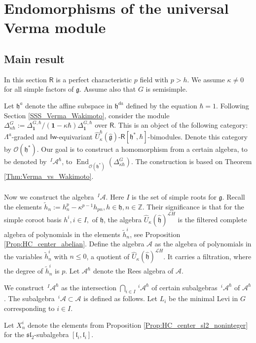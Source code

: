 \documentclass{amsart}
\theoremstyle{definition}
\newcommand{\slf}{\mathfrak{sl}}
\newcommand{\sss}{\subsubsection{}}
\newcommand{\Ring}{\mathsf{R}}
\newcommand{\g}{\mathfrak{g}}
\newcommand{\hg}{\hat{\mathfrak{g}}}
\newcommand{\h}{\mathfrak{h}}
\newcommand{\hh}{\hat{\mathfrak{h}}}
\newcommand{\Z}{\mathbb{Z}}
\newcommand{\lf}{\mathfrak{l}}
\newcommand{\A}{\mathscr{A}}
\newcommand{\Loop}{\mathscr{L}}
\newcommand{\bone}{\mathbf{1}}
\newcommand{\Iw}{\mathsf{Iw}}
\newcommand{\End}{\operatorname{End}}
\newcommand{\sO}{\mathscr{O}}
\numberwithin{equation}{section}
\begin{document}
\section{Endomorphisms of the universal Verma module}\label{S_Verma_endom}
\subsection{Main result}\label{SS:endo_main}
In this section $\Ring$ is a perfect characteristic $p$ field with $p>h$.
We assume $\kappa\neq 0$ for all simple factors of $\g$. Assume also that $G$ is semisimple.

Let $\h^a$ denote the affine subspace in $\h^{da}$ defined by the equation $\hbar=1$. Following Section \ref{SSS_Verma_Wakimoto}, consider the 
module $\Delta^{G}_{\kappa\hbar}:=\Delta^{G,\hbar}_{\bone}/(\bone-\kappa\hbar)\Delta^{G,\hbar}_{\bone}$ over $\Ring$. This is an object of the following category: $\Lambda^a$-graded and $\Iw$-equivariant $\widehat{U}^\hbar_{\kappa}(\hg)$-$\Ring[\h^*,\hbar]$-bimodules. Denote this category by $\sO(\h^*)$.
Our goal is to construct a homomorphism from a certain algebra, to be denoted 
by $\,^I\!\A^\hbar$, to $\End_{\sO(\h^*)}(\Delta^{G}_{\kappa\hbar})$. The construction is based on Theorem \ref{Thm:Verma_vs_Wakimoto}.

\sss Now we construct the algebra $\,^I\!\A$. Here $I$ is the set of simple roots for $\g$. Recall the elements $\tilde{h}_n:=h_n^p-\kappa^{p-1}h_{pn}, h\in \h, n\in \Z$.
Their significance is that for the simple coroot basis $h^i, i\in I,$ of $\h$, the algebra $\widehat{U}_\kappa(\hh)^{\Loop H}$ is the filtered complete algebra of polynomials in the elements $\tilde{h}^i_{n}$, see Proposition \ref{Prop:HC_center_abelian}. Define the algebra $\A$ as the algebra of polynomials in the variables $\tilde{h}^i_{n}$ with $n\leqslant 0$, a quotient of $\widehat{U}_\kappa(\hh)^{\Loop H}$. It carries a filtration, where the degree of $\tilde{h}^i_n$ is $p$. Let $\A^\hbar$ denote the Rees algebra of $\A$. 

We construct $\,^I\!\A^\hbar$ as the intersection $\bigcap_{i\in I}\,^i\!\A^\hbar$ of certain subalgebras $\,^i\!\A^\hbar$ of $\A^\hbar$. The subalgebra $\,^i\!\A\subset \A$ is defined as follows. Let $L_i$ be the minimal Levi in $G$ corresponding to $i\in I$. 

Let $X^i_n$ denote the elements from Proposition 
\ref{Prop:HC_center_sl2_noninteger} for the $\slf_2$-subalgebra $[\lf_i,\lf_i]$. 
\end{document}

